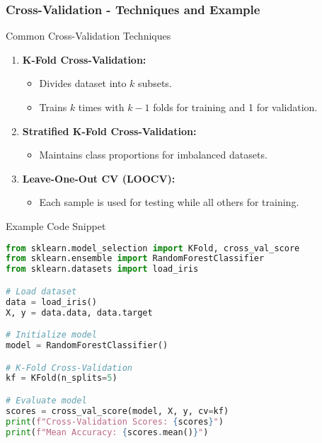 \documentclass[aspectratio=169]{beamer}
\begin{document}
\begin{frame}[fragile]
    \frametitle{Cross-Validation - Techniques and Example}
    
    \begin{block}{Common Cross-Validation Techniques}
        \begin{enumerate}
            \item \textbf{K-Fold Cross-Validation:}
                \begin{itemize}
                    \item Divides dataset into $k$ subsets.
                    \item Trains $k$ times with $k-1$ folds for training and 1 for validation.
                \end{itemize}
            
            \item \textbf{Stratified K-Fold Cross-Validation:}
                \begin{itemize}
                    \item Maintains class proportions for imbalanced datasets.
                \end{itemize}
            
            \item \textbf{Leave-One-Out CV (LOOCV):}
                \begin{itemize}
                    \item Each sample is used for testing while all others for training.
                \end{itemize}
        \end{enumerate}
    \end{block}
    
    \begin{block}{Example Code Snippet}
        \begin{lstlisting}[language=Python]
from sklearn.model_selection import KFold, cross_val_score
from sklearn.ensemble import RandomForestClassifier
from sklearn.datasets import load_iris

# Load dataset
data = load_iris()
X, y = data.data, data.target

# Initialize model
model = RandomForestClassifier()

# K-Fold Cross-Validation
kf = KFold(n_splits=5)

# Evaluate model
scores = cross_val_score(model, X, y, cv=kf)
print(f"Cross-Validation Scores: {scores}")
print(f"Mean Accuracy: {scores.mean()}")
        \end{lstlisting}
    \end{block}
\end{frame}
\end{document}
